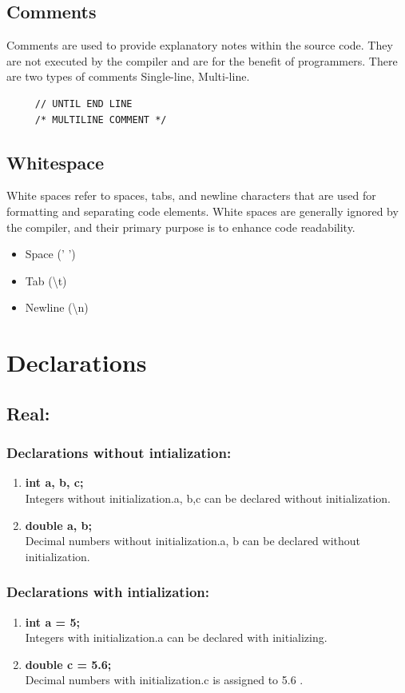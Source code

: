 \documentclass[12pt]{article}
\begin{document}
\subsection{Comments}
Comments are used to provide explanatory notes within the source code. They are not executed by the compiler and are for the benefit of programmers. There are two types of comments Single-line, Multi-line. \\

\begin{BVerbatim}
     // UNTIL END LINE 
     /* MULTILINE COMMENT */
\end{BVerbatim}

\subsection{Whitespace}
White spaces refer to spaces, tabs, and newline characters that are used for formatting and separating code elements. White spaces are generally ignored by the compiler, and their primary purpose is to enhance code readability.
\begin{itemize}
    \item Space (' ')
    \item Tab (\textbackslash{}t)
    \item Newline (\textbackslash{}n)
\end{itemize}

\section{Declarations}
\subsection{Real:}
\subsubsection{Declarations without intialization:}
\begin{enumerate}
    \item \textbf{int a, b, c;} \\
        Integers without initialization.a, b,c can be declared without initialization.
    \item \textbf{double a, b;} \\
        Decimal numbers without initialization.a, b can be declared without initialization.
    \end{enumerate}
\subsubsection{Declarations with intialization:}
\begin{enumerate}
    \item  \textbf{int a = 5;}\\
        Integers with initialization.a can be declared with initializing.
    \item  \textbf{double c = 5.6;}\\
        Decimal numbers with initialization.c is assigned to 5.6 .
\end{enumerate}
\end{document}
